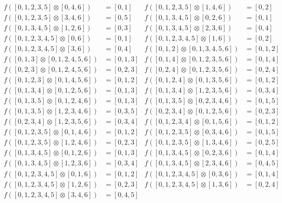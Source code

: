 \begin{align*}
f( [0, 1, 2, 3, 5] \otimes [0, 4, 6] )&= [0, 1] &
f( [0, 1, 2, 3, 5] \otimes [1, 4, 6] )&= [0, 2] \\
f( [0, 1, 2, 3, 5] \otimes [3, 4, 6] )&= [0, 5] &
f( [0, 1, 3, 4, 5] \otimes [0, 2, 6] )&= [0, 1] \\
f( [0, 1, 3, 4, 5] \otimes [1, 2, 6] )&= [0, 3] &
f( [0, 1, 3, 4, 5] \otimes [2, 3, 6] )&= [0, 4] \\
f( [0, 1, 2, 3, 4, 5] \otimes [0, 6] )&= [0, 1] &
f( [0, 1, 2, 3, 4, 5] \otimes [1, 6] )&= [0, 2] \\
f( [0, 1, 2, 3, 4, 5] \otimes [3, 6] )&= [0, 4] &
f( [0, 1, 2] \otimes [0, 1, 3, 4, 5, 6] )&= [0, 1, 2] \\
f( [0, 1, 3] \otimes [0, 1, 2, 4, 5, 6] )&= [0, 1, 3] &
f( [0, 1, 4] \otimes [0, 1, 2, 3, 5, 6] )&= [0, 1, 4] \\
f( [0, 2, 3] \otimes [0, 1, 2, 4, 5, 6] )&= [0, 2, 3] &
f( [0, 2, 4] \otimes [0, 1, 2, 3, 5, 6] )&= [0, 2, 4] \\
f( [0, 1, 2, 3] \otimes [0, 1, 4, 5, 6] )&= [0, 1, 2] &
f( [0, 1, 2, 4] \otimes [0, 1, 3, 5, 6] )&= [0, 1, 2] \\
f( [0, 1, 3, 4] \otimes [0, 1, 2, 5, 6] )&= [0, 1, 3] &
f( [0, 1, 3, 4] \otimes [1, 2, 3, 5, 6] )&= [0, 3, 4] \\
f( [0, 1, 3, 5] \otimes [0, 1, 2, 4, 6] )&= [0, 1, 3] &
f( [0, 1, 3, 5] \otimes [0, 2, 3, 4, 6] )&= [0, 1, 5] \\
f( [0, 1, 3, 5] \otimes [1, 2, 3, 4, 6] )&= [0, 3, 5] &
f( [0, 2, 3, 4] \otimes [0, 1, 2, 5, 6] )&= [0, 2, 3] \\
f( [0, 2, 3, 4] \otimes [1, 2, 3, 5, 6] )&= [0, 3, 4] &
f( [0, 1, 2, 3, 4] \otimes [0, 1, 5, 6] )&= [0, 1, 2] \\
f( [0, 1, 2, 3, 5] \otimes [0, 1, 4, 6] )&= [0, 1, 2] &
f( [0, 1, 2, 3, 5] \otimes [0, 3, 4, 6] )&= [0, 1, 5] \\
f( [0, 1, 2, 3, 5] \otimes [1, 2, 4, 6] )&= [0, 2, 3] &
f( [0, 1, 2, 3, 5] \otimes [1, 3, 4, 6] )&= [0, 2, 5] \\
f( [0, 1, 3, 4, 5] \otimes [0, 1, 2, 6] )&= [0, 1, 3] &
f( [0, 1, 3, 4, 5] \otimes [0, 2, 3, 6] )&= [0, 1, 4] \\
f( [0, 1, 3, 4, 5] \otimes [1, 2, 3, 6] )&= [0, 3, 4] &
f( [0, 1, 3, 4, 5] \otimes [2, 3, 4, 6] )&= [0, 4, 5] \\
f( [0, 1, 2, 3, 4, 5] \otimes [0, 1, 6] )&= [0, 1, 2] &
f( [0, 1, 2, 3, 4, 5] \otimes [0, 3, 6] )&= [0, 1, 4] \\
f( [0, 1, 2, 3, 4, 5] \otimes [1, 2, 6] )&= [0, 2, 3] &
f( [0, 1, 2, 3, 4, 5] \otimes [1, 3, 6] )&= [0, 2, 4] \\
f( [0, 1, 2, 3, 4, 5] \otimes [3, 4, 6] )&= [0, 4, 5]
\end{align*}
